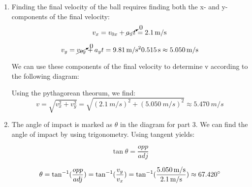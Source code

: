 {\begin{mdframed}[backgroundcolor=blue!10!white]
\begin{enumerate}
	\begin{equation*}
	x - x_0 = (\SI{2.1}{m/s})(\SI{0.515}{s})  \approx \SI{1.081}{m}
\end{equation*}
\item Finding the final velocity of the ball requires finding both the x- and y- components of the final velocity:
	\begin{equation*}
	v_x = v_{0x} + \cancelto{0}{a_x t} = \SI{2.1}{m/s}
\end{equation*}

	\begin{equation*}
	v_y = \cancelto{0}{v_{0y}} + a_y t = \SI{9.81}{m/s^2} \SI{0.515}{s} \approx \SI{5.050}{m/s}
\end{equation*}
	
	
	We can use these components of the final velocity to determine v according to the following diagram:
	

		Using the pythagorean theorum, we find:
			\begin{equation*}
			v = \sqrt{v_x^2 + v_y^2} = \sqrt{(\SI{2.1}{m/s})^2+(\SI{5.050}{m/s})^2} \approx \SI{5.470}{m/s}
		\end{equation*}
	
	\item The angle of impact is marked as \color{blue} $\theta$ \color{black} in the diagram for part 3.  We can find the angle of impact by using trigonometry.  Using tangent yields:
	
			\begin{equation*}
	\tan {\theta} = \frac{opp}{adj} 
	\end{equation*}

	\begin{equation*}
	\theta = \tan^{-1} (\frac{opp}{adj}) = \tan^{-1} (\frac{v_y}{v_x}) = \tan^{-1} (\frac{\SI{5.050}{m/s}}{\SI{2.1}{m/s}}) \approx 67.420 \degree
	\end{equation*}


\end{enumerate}
\end{mdframed}}
